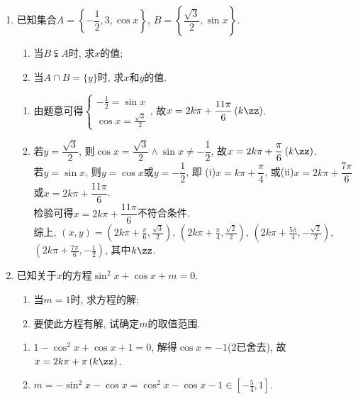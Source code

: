 \begin{enumerate}
\item 已知集合$A=\left\{-\dfrac{1}{2},3,\cos{x}\right\}$, $B=\left\{\dfrac{\sqrt{3}}{2},\sin{x}\right\}$. 
\begin{enumerate}[(1)]
\item 当$B\subsetneqq A$时, 求$x$的值;
\item 当$A\cap B=\{y\}$时, 求$x$和$y$的值. 
\end{enumerate}
\begin{jieda}
\begin{enumerate}[(1)]
\item 由题意可得$\begin{cases}
-\frac{1}{2}=\sin{x}\\
\cos{x}=\frac{\sqrt{3}}{2}
\end{cases}$, 故$x=2k\pi+\dfrac{11\pi}{6}\left(k\zz\right)$. 

\item 若$y=\dfrac{\sqrt{3}}{2}$, 则$\cos{x}=\dfrac{\sqrt{3}}{2}\land\sin{x}\neq-\dfrac{1}{2}$, 故$x=2k\pi+\dfrac{\pi}{6}\left(k\zz\right)$. \\
若$y=\sin{x}$, 则$y=\cos{x}$或$y=-\dfrac{1}{2}$, 即 (i)$x=k\pi+\dfrac{\pi}{4}$, 或(ii)$x=2k\pi+\dfrac{7\pi}{6}$或$x=2k\pi+\dfrac{11\pi}{6}$. \\
检验可得$x=2k\pi+\dfrac{11\pi}{6}$不符合条件. \\
综上, $\left(x,y\right)=\left(2k\pi+\frac{\pi}{6},\frac{\sqrt{3}}{2}\right)$, $\left(2k\pi+\frac{\pi}{4},\frac{\sqrt{2}}{2}\right)$, 
$\left(2k\pi+\frac{5\pi}{4},-\frac{\sqrt{2}}{2}\right)$, $\left(2k\pi+\frac{7\pi}{6},-\frac{1}{2}\right)$, 其中$k\zz$. 
\end{enumerate}
\end{jieda}

\item 已知关于$x$的方程$\sin^2x+\cos{x}+m=0$. 
\begin{enumerate}
\item 当$m=1$时, 求方程的解; 
\item 要使此方程有解, 试确定$m$的取值范围. 
\end{enumerate}
\begin{jieda}
\begin{enumerate}[(1)]
\item $1-\cos^2x+\cos{x}+1=0$, 解得$\cos{x}=-1$(2已舍去), 故$x=2k\pi+\pi\left(k\zz\right)$. 

\item $m=-\sin^2x-\cos{x}=\cos^2x-\cos{x}-1\in[-\frac{5}{4},1]$. 
\end{enumerate}
\end{jieda}



\end{enumerate}
